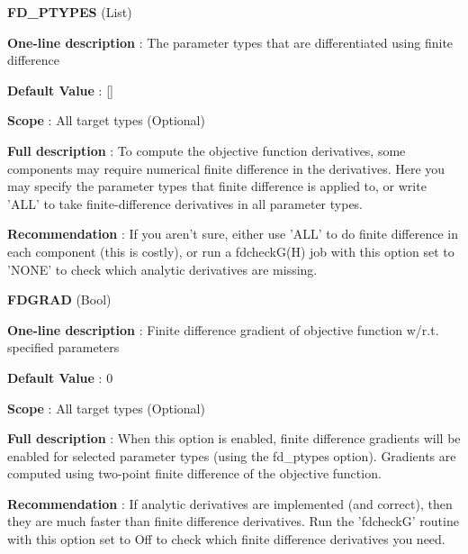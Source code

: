 \begin{DoxyItemize}
\item {\bfseries  \-F\-D\-\_\-\-P\-T\-Y\-P\-E\-S } (\-List) \par
{\bfseries  \-One-\/line description }\-: \-The parameter types that are differentiated using finite difference \par
{\bfseries  \-Default \-Value }\-: \mbox{[}\mbox{]} \par
{\bfseries  \-Scope }\-: \-All target types (\-Optional) \par
{\bfseries  \-Full description }\-: \-To compute the objective function derivatives, some components may require numerical finite difference in the derivatives. \-Here you may specify the parameter types that finite difference is applied to, or write '\-A\-L\-L' to take finite-\/difference derivatives in all parameter types. \par
{\bfseries  \-Recommendation }\-: \-If you aren't sure, either use '\-A\-L\-L' to do finite difference in each component (this is costly), or run a fdcheck\-G(\-H) job with this option set to '\-N\-O\-N\-E' to check which analytic derivatives are missing.\end{DoxyItemize}
\begin{DoxyItemize}
\item {\bfseries  \-F\-D\-G\-R\-A\-D } (\-Bool) \par
{\bfseries  \-One-\/line description }\-: \-Finite difference gradient of objective function w/r.\-t. specified parameters \par
{\bfseries  \-Default \-Value }\-: 0 \par
{\bfseries  \-Scope }\-: \-All target types (\-Optional) \par
{\bfseries  \-Full description }\-: \-When this option is enabled, finite difference gradients will be enabled for selected parameter types (using the fd\-\_\-ptypes option). \-Gradients are computed using two-\/point finite difference of the objective function. \par
{\bfseries  \-Recommendation }\-: \-If analytic derivatives are implemented (and correct), then they are much faster than finite difference derivatives. \-Run the 'fdcheck\-G' routine with this option set to \-Off to check which finite difference derivatives you need.\end{DoxyItemize}
